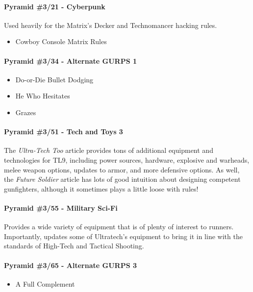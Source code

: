 \begin{multicols*}{3}
	\paragraph{\GURPS Pyramid \#3/21 - Cyberpunk}
	Used heavily for the Matrix's Decker and Technomancer hacking rules.
	
	\begin{itemize}
		\itemsep0em
		\item  Cowboy Console Matrix Rules
	\end{itemize}
	
	\paragraph{\GURPS Pyramid \#3/34 - Alternate GURPS 1}
	
	\begin{itemize} 
		\itemsep0em 
		\item Do-or-Die Bullet Dodging
		\item He Who Hesitates
		\item Grazes
	\end{itemize}

	\paragraph{\GURPS Pyramid \#3/51 - Tech and Toys 3}
	The \textit{Ultra-Tech Too} article provides tons of additional equipment and technologies for TL9, including power sources, hardware, explosive and warheads, melee weapon options, updates to armor, and more defensive options. As well, the \textit{Future Soldier} article has lots of good intuition about designing competent gunfighters, although it sometimes plays a little loose with rules!
	
	\paragraph{\GURPS Pyramid \#3/55 - Military Sci-Fi}
	Provides a wide variety of equipment that is of plenty of interest to runners. Importantly, updates some of Ultratech's equipment to bring it in line with the standards of High-Tech and Tactical Shooting.
	
	\paragraph{\GURPS Pyramid \#3/65 - Alternate GURPS 3}
	\begin{itemize}
		\itemsep0em 
		\item A Full Complement
	\end{itemize}


\end{multicols*}
